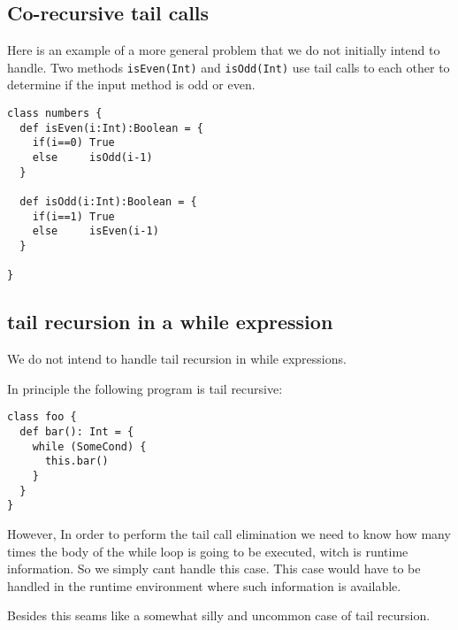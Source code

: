 \subsection{Co-recursive tail calls}
\label{sec:corecursionexample}

Here is an example of a more general problem that we do not initially intend to handle. Two methods \texttt{isEven(Int)} and \texttt{isOdd(Int)} use tail calls to each other to determine if the input method is odd or even.

\begin{lstlisting}
class numbers {
  def isEven(i:Int):Boolean = {
    if(i==0) True
    else     isOdd(i-1)
  }
  
  def isOdd(i:Int):Boolean = {
    if(i==1) True
    else     isEven(i-1)
  }
  
}
\end{lstlisting}


\subsection{tail recursion in a while expression}

We do not intend to handle tail recursion in while expressions.

In principle the following program is tail recursive:


\begin{lstlisting}
class foo {
  def bar(): Int = {
    while (SomeCond) {
      this.bar()
    } 
  }
}

\end{lstlisting}
However, In order to perform the tail call elimination we need to know how many times the body of the while loop is going to be executed, witch is runtime information. So we simply cant handle this case. This case would have to be handled in the runtime environment where such information is available.

Besides this seams like a somewhat silly and uncommon case of tail recursion.
